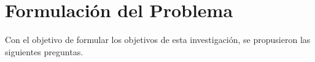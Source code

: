 	



	\section{Formulación del Problema}
	Con el objetivo de formular los objetivos de esta investigación, se propusieron las siguientes preguntas.
